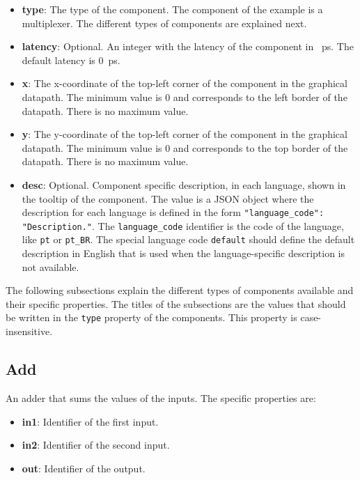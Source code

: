 \documentclass[11pt,a4paper,twoside,titlepage]{report}
\begin{document}
\begin{itemize}
	\item \textbf{type}: The type of the component. The component of the example
		is a multiplexer. The different types of components are explained next.
	\item \textbf{latency}: Optional. An integer with the latency of the component
		in \SI{}{\pico\second}. The default latency is \SI{0}{\pico\second}.
	\item \textbf{x}: The x-coordinate of the top-left corner of the component in 
		the graphical datapath. The minimum value is 0 and corresponds to the left
		border of the datapath. There is no maximum value.
	\item \textbf{y}: The y-coordinate of the top-left corner of the component in 
		the graphical datapath. The minimum value is 0 and corresponds to the top
		border of the datapath. There is no maximum value.
	\item \textbf{desc}: Optional. Component specific description, in each language, 
		shown in the tooltip of the component.
		The value is a JSON object where the description for each language is defined
		in the form \verb+"language_code": "Description."+. The \verb+language_code+
		identifier is the code of the language, like \verb+pt+ or \verb+pt_BR+.
		The special language code \verb+default+ should define the default description
		in English that is used when the language-specific description is not available.
\end{itemize}

The following subsections explain the different types of components available
and their specific properties. 
The titles of the subsections are the values that should be written in the
\verb+type+ property of the components. This property is case-insensitive.

\subsection{Add}

An adder that sums the values of the inputs. The specific properties are:
\begin{itemize}
	\item \textbf{in1}: Identifier of the first input.
	\item \textbf{in2}: Identifier of the second input.
	\item \textbf{out}: Identifier of the output.
\end{itemize}
\end{document}
